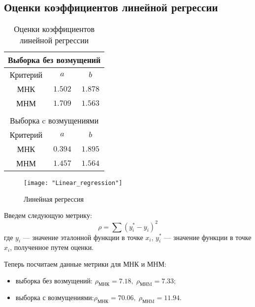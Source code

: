 \documentclass[12pt,a4paper]{article}
\begin{document}
	\subsection{Оценки коэффициентов линейной регрессии}
	\begin{center}
		\begin{table}[H]
			\begin{center}
				\begin{tabular}{|c|c|c|}
					\multicolumn{3}{c}{Выборка без возмущений} \\
					\hline
					Критерий & $a$ & $b$\\
					\hline
					МНК & $1.502$ & $1.878$\\
					\hline
					МНМ & $1.709$ & $1.563$\\
					\hline
					\multicolumn{3}{c}{ } \\
					\multicolumn{3}{c}{Выборка c возмущениями} \\
					\hline
					Критерий & $a$ & $b$\\
					\hline
					МНК & $0.394$ & $1.895$\\
					\hline
					МНМ & $1.457$ & $1.564$\\
					\hline					
				\end{tabular}
				\caption{Оценки коэффициентов линейной регрессии}
			\end{center}
		\end{table}
		
		\begin{figure}[H]
			\texttt{[image: "Linear\_regression"]} 
			\caption[Линейная регрессия]{Линейная регрессия}
		\end{figure}
	\end{center}
	
	Введем следующую метрику: $$\rho=\sum(y^*_i-y_i)^2$$
	где $y_i$ --- значение эталонной функции в точке $x_i$, $y^*_i$ --- значение функции в точке $x_i$, полученное путем оценки.
	
	Теперь посчитаем данные метрики для МНК и МНМ:
	\begin{itemize}
		\item  выборка без возмущений: $\rho_\text{МНК} = 7.18,\; \rho_\text{МНM} = 7.33$;
		
		\item  выборка с возмущениями:$\rho_\text{МНК} = 70.06,\; \rho_\text{МНM} = 11.94$.
	\end{itemize}
	
\end{document}
